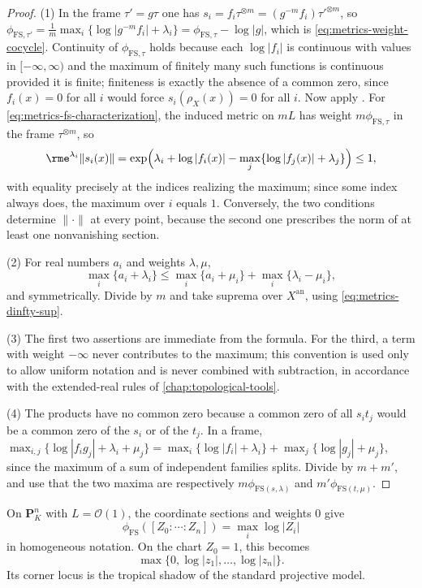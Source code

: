 \begin{proof}
(1) In the frame $\tau'=g\tau$ one has
$s_i=f_i\tau^{\otimes m}=(g^{-m}f_i)\tau'^{\otimes m}$, so
$\phi_{\mathrm{FS},\tau'}=\frac1m\max_i\{\log|g^{-m}f_i|+\lambda_i\}
=\phi_{\mathrm{FS},\tau}-\log|g|$, which is
\eqref{eq:metrics-weight-cocycle}. Continuity of
$\phi_{\mathrm{FS},\tau}$ holds because each $\log|f_i|$ is continuous
with values in $[-\infty,\infty)$ and the maximum of finitely many such
functions is continuous provided it is finite; finiteness is exactly the
absence of a common zero, since $f_i(x)=0$ for all $i$ would force
$s_i(\rho_X(x))=0$ for all $i$. Now apply
. For
\eqref{eq:metrics-fs-characterization}, the induced metric on $mL$ has
weight $m\phi_{\mathrm{FS},\tau}$ in the frame $\tau^{\otimes m}$, so
\[
 \rme^{\lambda_i}\|s_i(x)\|
 =\exp\Bigl(\lambda_i+\log|f_i(x)|
   -\max_j\{\log|f_j(x)|+\lambda_j\}\Bigr)\le1,
\]
with equality precisely at the indices realizing the maximum; since some
index always does, the maximum over $i$ equals $1$. Conversely, the two
conditions determine $\|\cdot\|$ at every point, because the second one
prescribes the norm of at least one nonvanishing section.

(2) For real numbers $a_i$ and weights $\lambda,\mu$,
\[
 \max_i\{a_i+\lambda_i\}\le\max_i\{a_i+\mu_i\}
   +\max_i\{\lambda_i-\mu_i\},
\]
and symmetrically. Divide by $m$ and take suprema over
$X^{\mathrm{an}}$, using \eqref{eq:metrics-dinfty-sup}.

(3) The first two assertions are immediate from the formula. For the third,
a term with weight $-\infty$ never contributes to the maximum; this
convention is used only to allow uniform notation and is never combined with
subtraction, in accordance with the extended-real rules of
\cref{chap:topological-tools}.

(4) The products have no common zero because a common zero of all
$s_it_j$ would be a common zero of the $s_i$ or of the $t_j$. In a
frame,
$\max_{i,j}\{\log|f_ig_j|+\lambda_i+\mu_j\}
=\max_i\{\log|f_i|+\lambda_i\}+\max_j\{\log|g_j|+\mu_j\}$,
since the maximum of a sum of independent families splits. Divide by
$m+m'$, and use that the two maxima are respectively
$m\phi_{\mathrm{FS}(s,\lambda)}$ and
$m'\phi_{\mathrm{FS}(t,\mu)}$.
\end{proof}

\begin{example}
\label{ex:metrics-fs-projective-space}
On $\mathbf P^n_K$ with $L=\mathcal O(1)$, the coordinate sections and
weights $0$ give
\[
          \phi_{\mathrm{FS}}([Z_0:\cdots:Z_n])
             =\max_i\log|Z_i|
\]
in homogeneous notation. On the chart $Z_0=1$, this becomes
\[
 \max\{0,\log|z_1|,\ldots,\log|z_n|\}.
\]
Its corner locus is the tropical
shadow of the standard projective model.
\end{example}

